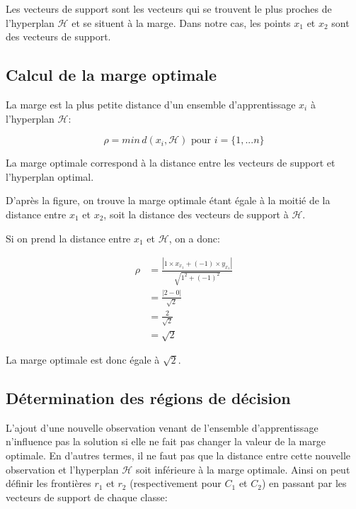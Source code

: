 \documentclass{article}
\begin{document}
\begin{multicols}{2}
Les vecteurs de support sont les vecteurs qui se trouvent le plus proches de
l'hyperplan $\mathcal{H}$ et se situent à la marge. Dans notre cas, les points
$x_1$ et $x_2$ sont des vecteurs de support.

\subsection{Calcul de la marge optimale}\label{subsec:ex12}

La marge est la plus petite distance d'un ensemble d'apprentissage $x_i$ à
l'hyperplan $\mathcal{H}$:

\begin{equation}
    \rho = min \, d(x_i, \mathcal{H}) \text{ pour }i = \{1,...n\}
\end{equation}

La marge optimale correspond à la distance entre les vecteurs de support et
l'hyperplan optimal.

D'après la figure, on trouve la marge optimale étant égale à la moitié de la
distance entre $x_1$ et $x_2$, soit la distance des vecteurs de support à
$\mathcal{H}$.

Si on prend la distance entre $x_1$ et $\mathcal{H}$, on a donc:

\begin{equation}
    \begin{split}
        \rho &= \frac{|1 \times x_{x_1} + (-1) \times y_{x_1}|}
        {\sqrt{1^2 + (-1)^2}} \\
             &= \frac{|2 - 0|}{\sqrt{2}} \\
             &= \frac{2}{\sqrt{2}} \\
             &= \sqrt{2}
    \end{split}
\end{equation}

La marge optimale est donc égale à $\sqrt{2}$.

\subsection{Détermination des régions de décision}\label{subsec:ex13}

L'ajout d'une nouvelle observation venant de l'ensemble d'apprentissage
n'influence pas la solution si elle ne fait pas changer la valeur de la marge
optimale. En d'autres termes, il ne faut pas que la distance entre cette
nouvelle observation et l'hyperplan $\mathcal{H}$ soit inférieure à la  marge
optimale. Ainsi on peut définir les frontières $r_1$ et $r_2$ (respectivement
pour $C_1$ et $C_2$) en passant par les vecteurs de support de chaque classe: 


\end{multicols}
\end{document}
